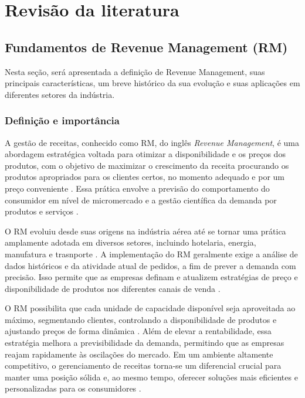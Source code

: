 \chapter{Revisão da literatura}


\section{Fundamentos de Revenue Management (RM)}
Nesta seção, será apresentada a definição de Revenue Management, suas principais características, um breve histórico da sua evolução e suas aplicações em diferentes setores da indústria.

\subsection{Definição e importância}
A gestão de receitas, conhecido como RM, do inglês \textit{Revenue Management}, é uma abordagem estratégica voltada para otimizar a disponibilidade e os preços dos produtos, com o objetivo de maximizar o crescimento da receita  procurando os produtos apropriados para os clientes certos, no momento adequado e por um preço conveniente \citep{Robert1997}. Essa prática envolve a previsão do comportamento do consumidor em nível de micromercado e a gestão científica da demanda por produtos e serviços \citep{4736064}.

O RM evoluiu desde suas origens na indústria aérea até se tornar uma prática amplamente adotada em diversos setores, incluindo hotelaria, energia, manufatura e trasnporte \citep{Cross1995ANIT, Cheraghi2010RevenueMI}. A implementação do RM geralmente exige a análise de dados históricos e da atividade atual de pedidos, a fim de prever a demanda com precisão. Isso permite que as empresas definam e atualizem estratégias de preço e disponibilidade de produtos nos diferentes canais de venda \citep{Cheraghi2010RevenueMI}.

O RM possibilita que cada unidade de capacidade disponível seja aproveitada ao máximo, segmentando clientes, controlando a disponibilidade de produtos e ajustando preços de forma dinâmica \citep{HEO2009446}. Além de elevar a rentabilidade, essa estratégia melhora a previsibilidade da demanda, permitindo que as empresas reajam rapidamente às oscilações do mercado. Em um ambiente altamente competitivo, o gerenciamento de receitas torna-se um diferencial crucial para manter uma posição sólida e, ao mesmo tempo, oferecer soluções mais eficientes e personalizadas para os consumidores \citep{Gallego1994}.

